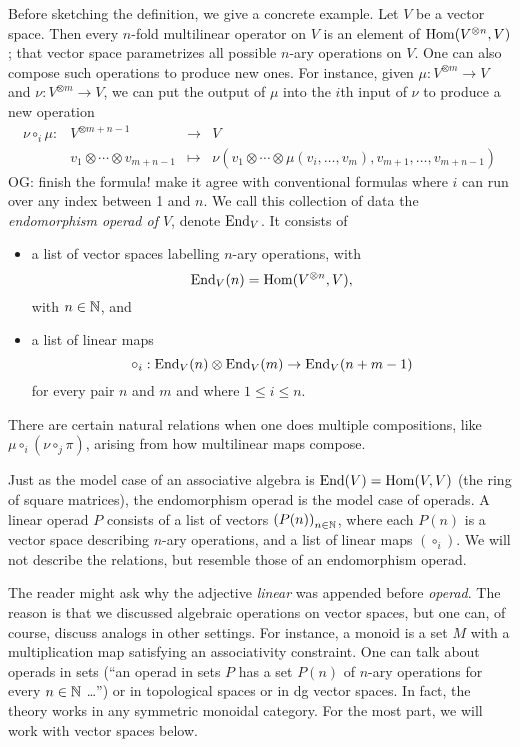\documentclass[11pt]{amsart}
\def\owen#1{{\textcolor{violet!50!black}{OG: {#1}}}}
\begin{document}
Before sketching the definition, we give a concrete example.
Let $V$ be a vector space.
Then every $n$-fold multilinear operator on $V$ is an element of ${\rm Hom}(V^{\otimes n}, V)$;
that vector space parametrizes all possible $n$-ary operations on $V$.
One can also compose such operations to produce new ones.
For instance, given $\mu : V^{\otimes m} \to V$ and $\nu: V^{\otimes m} \to V$, we can put the output of $\mu$ into the $i$th input of $\nu$ to produce a new operation
\[
\begin{array}{cccc}
\nu \circ_i \mu: & V^{\otimes m+n-1} & \to & V\\
& v_1 \otimes \cdots \otimes v_{m+n-1} & \mapsto & \nu(v_1 \otimes \cdots \otimes \mu(v_i, \ldots, v_m), v_{m+1}, \ldots, v_{m+n-1})
\end{array}
\]
\owen{finish the formula! make it agree with conventional formulas}
where $i$ can run over any index between 1 and $n$.
We call this collection of data the {\em endomorphism operad of $V$}, denote ${\rm End}_V$.
It consists of 
\begin{itemize}
\item a list of vector spaces labelling $n$-ary operations, with 
\[
{\rm End}_V(n)= {\rm Hom}(V^{\otimes n}, V),
\]
with $n \in \mathbb N$, and
\item a list of linear maps
\[
\circ_i : {\rm End}_V(n) \otimes {\rm End}_V(m) \to {\rm End}_V(n+m-1)
\]
for every pair $n$ and $m$ and where $1 \leq i \leq n$.
\end{itemize}
There are certain natural relations when one does multiple compositions, like $\mu \circ_i (\nu \circ_j \pi)$, arising from how multilinear maps compose.

Just as the model case of an associative algebra is ${\rm End}(V) = {\rm Hom}(V,V)$ (the ring of square matrices),
the endomorphism operad is the model case of operads.
A linear operad $P$ consists of a list of vectors $\left(P(n) \right)_{n \in \mathbb N}$, where each $P(n)$ is a vector space describing $n$-ary operations, and a list of linear maps $\left(\circ_i\right)$.
We will not describe the relations, but resemble those of an endomorphism operad.

\begin{rmk}
The reader might ask why the adjective {\em linear} was appended before {\em operad}.
The reason is that we discussed algebraic operations on vector spaces,
but one can, of course, discuss analogs in other settings.
For instance, a monoid is a set $M$ with a multiplication map satisfying an associativity constraint.
One can talk about operads in sets (``an operad in sets $P$ has a set $P(n)$ of $n$-ary operations for every $n \in \mathbb N$ \dots'') or in topological spaces or in dg vector spaces.
In fact, the theory works in any symmetric monoidal category. 
For the most part, we will work with vector spaces below.
\end{rmk}
\end{document}
